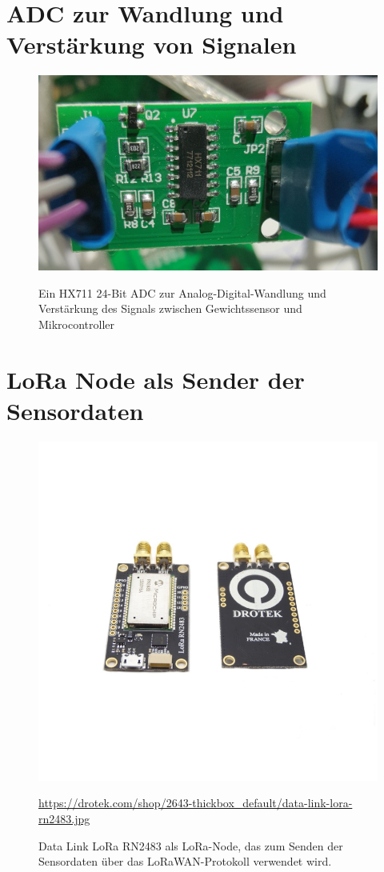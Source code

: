 \section{ADC zur Wandlung und Verstärkung von Signalen}
\begin{figure}[ht]
    \center
    \includegraphics[width=14cm]{Bilder/gewichtssensor.jpg}\\
    \caption{Ein HX711 24-Bit ADC zur Analog-Digital-Wandlung und Verstärkung des Signals zwischen Gewichtssensor und Mikrocontroller}
    \label{fig:Gewichtssensor}
\end{figure}
\newpage
\section{LoRa Node als Sender der Sensordaten}
\begin{figure}[ht]
    \center
    \includegraphics[width=14cm]{Bilder/lora-node.jpg}\\
    \caption{Data Link LoRa RN2483 als LoRa-Node, das zum Senden der Sensordaten über das LoRaWAN-Protokoll verwendet wird.}
    \begin{flushleft}
        \quelle\url{https://drotek.com/shop/2643-thickbox_default/data-link-lora-rn2483.jpg}
    \end{flushleft}
    \label{fig:Lora-Node}
\end{figure}

